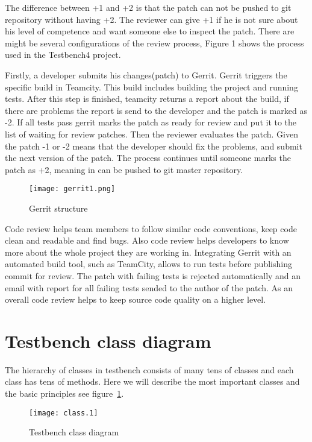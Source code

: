   The difference between +1 and +2 is that the patch can not be pushed to git
  repository without having +2. The reviewer can give +1 if he is not sure about his level of competence
  and want someone else to inspect the patch. There are might be several configurations of the review process,
  Figure 1 shows the process used in the Testbench4 project.

  Firstly, a developer submits his changes(patch) to Gerrit. Gerrit triggers the
  specific build in Teamcity. This build includes building the project and
  running tests. After this step is finished, teamcity returns a report about the build, if there are problems 
  the report is send to the developer and the patch is marked as -2. If all
  tests pass gerrit marks the patch as ready for review and put it to the list of waiting for review patches.
  Then the reviewer evaluates the patch. Given the patch -1 or -2 means that the developer should fix the problems,
  and submit the next version of the patch. The process continues until someone
  marks the patch as +2,  meaning in can be pushed to git master repository.
    \begin{figure}
      \texttt{[image: gerrit1.png]}
      \caption{Gerrit structure}
    \end{figure}
  Code review helps team members to follow similar code conventions, 
  keep code clean and readable and find bugs. Also code review helps developers to know more about 
  the whole project they are working in. Integrating Gerrit with an automated build tool, 
  such as TeamCity, allows to run tests before publishing commit for review. 
  The patch with failing tests is rejected automatically and an email with report for all failing tests sended 
  to the author of the patch. As an overall code review helps to keep source code quality on a higher level.


  \section{Testbench class diagram}

  The hierarchy of classes in testbench consists of many tens of classes and each class has tens of methods.
  Here we will describe the most important classes and the basic principles see
  figure~\ref{fig:classdiagram}.
	\begin{figure}
		\label{fig:classdiagram}
	    \texttt{[image: class.1]}
	    \caption{Testbench class diagram}
    \end{figure}
    
